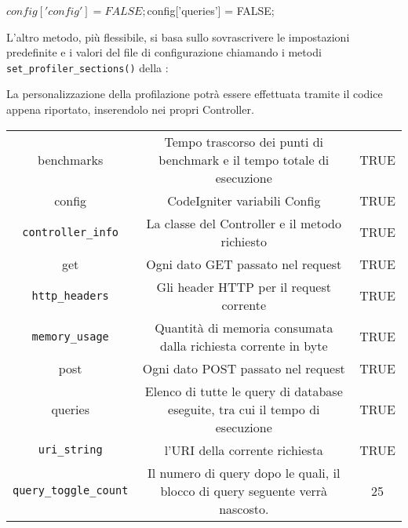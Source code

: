 \begin{code}
$config['config'] = FALSE;
$config['queries'] = FALSE;
\end{code}

L'altro metodo, più flessibile, si basa sullo sovrascrivere le impostazioni predefinite e i valori del file di configurazione chiamando i metodi \verb|set_profiler_sections()| della :


La personalizzazione della profilazione potrà essere effettuata  tramite il codice appena riportato, inserendolo nei propri Controller.

\begin{tabular}{|c|c|c|}
benchmarks & Tempo trascorso dei punti di benchmark e il tempo totale di esecuzione & TRUE  \\ 
config & CodeIgniter variabili Config &  TRUE \\ 
\verb|controller_info|	& La classe del Controller e il metodo richiesto & TRUE  \\ 
get & Ogni dato GET passato nel request & TRUE  \\ 
\verb|http_headers| & Gli header HTTP per il request corrente & TRUE  \\ 
\verb|memory_usage| & Quantità di memoria consumata dalla richiesta corrente in byte & TRUE \\ 
post & Ogni dato POST passato nel request & TRUE \\ 
queries & Elenco di tutte le query di database eseguite, tra cui il tempo di esecuzione & TRUE \\ 
\verb|uri_string| & l'URI della corrente richiesta  & TRUE \\ 
\verb|query_toggle_count| & Il numero di query dopo le quali, il blocco di query seguente verrà nascosto. & 25 \\ 
\end{tabular} 
